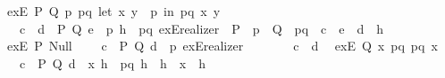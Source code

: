 \begin{isabellebody}
\isanewline
\ \ exE\ {\isacharparenleft}{\kern0pt}P{\isacharcomma}{\kern0pt}\ Q{\isacharparenright}{\kern0pt}{\isacharcolon}{\kern0pt}\ {\isachardoublequoteopen}{\isasymlambda}p\ pq{\isachardot}{\kern0pt}\ let\ {\isacharparenleft}{\kern0pt}x{\isacharcomma}{\kern0pt}\ y{\isacharparenright}{\kern0pt}\ {\isacharequal}{\kern0pt}\ p\ in\ pq\ x\ y{\isachardoublequoteclose}\isanewline
\ \ \ \ {\isachardoublequoteopen}\isactrlbold {\isasymlambda}{\isacharparenleft}{\kern0pt}c{\isacharcolon}{\kern0pt}\ {\isacharunderscore}{\kern0pt}{\isacharparenright}{\kern0pt}\ {\isacharparenleft}{\kern0pt}d{\isacharcolon}{\kern0pt}\ {\isacharunderscore}{\kern0pt}{\isacharparenright}{\kern0pt}\ P\ Q\ {\isacharparenleft}{\kern0pt}e{\isacharcolon}{\kern0pt}\ {\isacharunderscore}{\kern0pt}{\isacharparenright}{\kern0pt}\ p\ {\isacharparenleft}{\kern0pt}h{\isacharcolon}{\kern0pt}\ {\isacharunderscore}{\kern0pt}{\isacharparenright}{\kern0pt}\ pq{\isachardot}{\kern0pt}\ exE{\isacharunderscore}{\kern0pt}realizer\ {\isasymcdot}\ P\ {\isasymcdot}\ p\ {\isasymcdot}\ Q\ {\isasymcdot}\ pq\ {\isasymbullet}\ c\ {\isasymbullet}\ e\ {\isasymbullet}\ d\ {\isasymbullet}\ h{\isachardoublequoteclose}\isanewline
\isanewline
\ \ exE\ {\isacharparenleft}{\kern0pt}P{\isacharparenright}{\kern0pt}{\isacharcolon}{\kern0pt}\ {\isachardoublequoteopen}Null{\isachardoublequoteclose}\isanewline
\ \ \ \ {\isachardoublequoteopen}\isactrlbold {\isasymlambda}{\isacharparenleft}{\kern0pt}c{\isacharcolon}{\kern0pt}\ {\isacharunderscore}{\kern0pt}{\isacharparenright}{\kern0pt}\ P\ Q\ {\isacharparenleft}{\kern0pt}d{\isacharcolon}{\kern0pt}\ {\isacharunderscore}{\kern0pt}{\isacharparenright}{\kern0pt}\ p{\isachardot}{\kern0pt}\ exE{\isacharunderscore}{\kern0pt}realizer{\isacharprime}{\kern0pt}\ {\isasymcdot}\ {\isacharunderscore}{\kern0pt}\ {\isasymcdot}\ {\isacharunderscore}{\kern0pt}\ {\isasymcdot}\ {\isacharunderscore}{\kern0pt}\ {\isasymbullet}\ c\ {\isasymbullet}\ d{\isachardoublequoteclose}\isanewline
\isanewline
\ \ exE\ {\isacharparenleft}{\kern0pt}Q{\isacharparenright}{\kern0pt}{\isacharcolon}{\kern0pt}\ {\isachardoublequoteopen}{\isasymlambda}x\ pq{\isachardot}{\kern0pt}\ pq\ x{\isachardoublequoteclose}\isanewline
\ \ \ \ {\isachardoublequoteopen}\isactrlbold {\isasymlambda}{\isacharparenleft}{\kern0pt}c{\isacharcolon}{\kern0pt}\ {\isacharunderscore}{\kern0pt}{\isacharparenright}{\kern0pt}\ P\ Q\ {\isacharparenleft}{\kern0pt}d{\isacharcolon}{\kern0pt}\ {\isacharunderscore}{\kern0pt}{\isacharparenright}{\kern0pt}\ x\ {\isacharparenleft}{\kern0pt}h{}{\isacharcolon}{\kern0pt}\ {\isacharunderscore}{\kern0pt}{\isacharparenright}{\kern0pt}\ pq\ {\isacharparenleft}{\kern0pt}h{}{\isacharcolon}{\kern0pt}\ {\isacharunderscore}{\kern0pt}{\isacharparenright}{\kern0pt}{\isachardot}{\kern0pt}\ h{}\ {\isasymcdot}\ x\ {\isasymbullet}\ h{}{\isachardoublequoteclose}\isanewline

\end{isabellebody}
